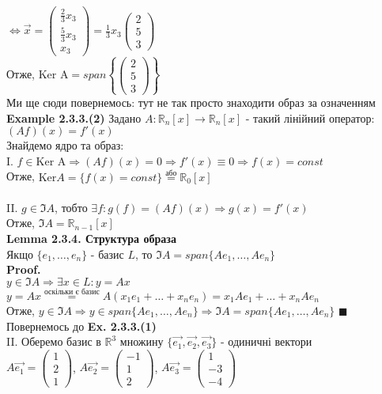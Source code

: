 \documentclass[a4paper, 14pt]{extarticle}
\def\ex#1{\textbf{Example {#1}}}
\def\lm#1{\textbf{Lemma {#1}}}
\def\proof{\textbf{Proof.}\\}
\def\bigline{\vspace{5mm}\\}
\def\qed{$\blacksquare$}
\begin{document}
	$\iff \vec{x} = \begin{pmatrix} \frac{2}{3}x_3 \\ \frac{5}{3}x_3 \\ x_3  \end{pmatrix} = \frac{1}{3}x_3 \begin{pmatrix} 2 \\ 5 \\ 3 \end{pmatrix}$\\
	Отже, $\textrm{Ker A} = span \left\{\begin{pmatrix} 2 \\ 5 \\ 3 \end{pmatrix} \right\}$\\
	Ми ще сюди повернемось: тут не так просто знаходити образ за означенням
	\bigline
	\ex{2.3.3.(2)} Задано $A: \mathbb{R}_n[x] \to \mathbb{R}_n[x]$ - такий лінійний оператор:\\
	$(Af)(x) = f'(x)$\\
	Знайдемо ядро та образ:\\
	I. $f \in \textrm{Ker A} \Rightarrow (Af)(x) = 0 \Rightarrow f'(x) \equiv 0 \Rightarrow f(x) = const$\\
	Отже, $\textrm{Ker} A = \{ f(x) = const\} \overset{\textrm{або}}{=} \mathbb{R}_0[x]$
	\\ \\
	II. $g \in \Im A$, тобто $\exists f: g(f) = (Af)(x) \Rightarrow g(x) = f'(x)$\\
	Отже, $\Im A = \mathbb{R}_{n-1}[x]$
	\bigline
	\lm{2.3.4. Структура образа}\\
	Якщо $\{e_1,\dots, e_n\}$ - базис $L$, то $\Im A = span \{Ae_1,\dots, Ae_n\}$\\
	\proof
	$y \in \Im A \Rightarrow \exists x \in L: y = Ax$\\
	$y = Ax \overset{\textrm{оскільки є базис}}{=} A(x_1e_1 + \dots + x_n e_n) = x_1 Ae_1 + \dots + x_n A e_n$\\
	Отже, $y \in \Im A \Rightarrow y \in span \{Ae_1, \dots, Ae_n \} \Rightarrow \Im A = span \{Ae_1, \dots, Ae_n \}$ \qed
	\bigline
	Повернемось до \textbf{Ex. 2.3.3.(1)}\\
	II. Оберемо базис в $\mathbb{R}^3$ множину $\{\vec{e_1}, \vec{e_2}, \vec{e_3}\}$ - одиничні вектори\\
	$A\vec{e_1} = \begin{pmatrix} 1 \\ 2 \\ 1 \end{pmatrix}$, $A\vec{e_2} = \begin{pmatrix} -1 \\ 1 \\ 2 \end{pmatrix}$, $A\vec{e_3} = \begin{pmatrix} 1 \\ -3 \\ -4 \end{pmatrix}$\\
\end{document}
